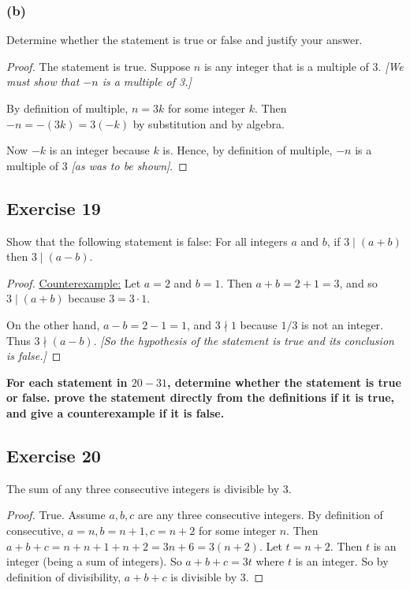 \documentclass[14pt]{extarticle}
\newcommand{\cy}{\color{cyan}}
\begin{document}
\subsubsection{(b)}
Determine whether the statement is true or false and justify your answer.

\begin{proof}
    The statement is true. Suppose $n$ is any integer that is a multiple of 3. {\it [We must show that $-n$ is a multiple of 3.]}

    By definition of multiple, $n = 3k$ for some integer $k$. Then $-n = -(3k) = 3(-k)$ by substitution and by algebra.

    Now $-k$ is an integer because $k$ is. Hence, by definition of multiple, $-n$ is a multiple of 3 {\it [as was to be shown]}.
\end{proof}

\subsection{Exercise 19}
Show that the following statement is false: For all integers $a$ and $b$, if $3\mid (a + b)$ then $3 \mid (a - b)$.

\begin{proof}
    \underline{Counterexample:} Let $a = 2$ and $b = 1$. Then
    $a + b = 2 + 1 = 3$, and so $3 \mid (a + b)$ because $3 = 3\cdot 1$.

    On the other hand, $a - b = 2 - 1 = 1$, and $3 \nmid 1$ because $1/3$ is not an integer. Thus $3 \nmid (a - b)$. {\it [So the hypothesis of the statement is true and its conclusion is false.]}
\end{proof}

{\bf \cy For each statement in $20-31$, determine whether the statement is true or false. prove the statement directly from the definitions if it is true, and give a counterexample if it is false.}

\subsection{Exercise 20}
The sum of any three consecutive integers is divisible by 3.

\begin{proof}
    True. Assume $a,b,c$ are any three consecutive integers. By definition of consecutive, $a = n, b = n+1, c = n+2$ for some integer $n$. Then $a+b+c = n+n+1+n+2 = 3n+6 = 3(n+2)$. Let $t = n+2$. Then $t$ is an integer (being a sum of integers). So $a+b+c = 3t$ where $t$ is an integer. So by definition of divisibility, $a+b+c$ is divisible by 3.
\end{proof}
\end{document}
